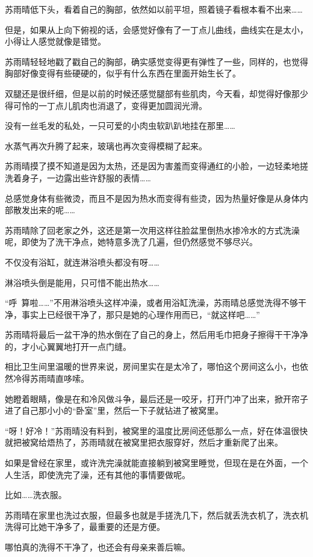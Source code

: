 苏雨晴低下头，看着自己的胸部，依然如以前平坦，照着镜子看根本看不出来……

但是，如果从上向下俯视的话，会感觉好像有了一丁点儿曲线，曲线实在是太小，小得让人感觉就像是错觉。

苏雨晴轻轻地戳了戳自己的胸部，确实感觉变得更有弹性了一些，同样的，也觉得胸部好像变得有些硬硬的，似乎有什么东西在里面开始生长了。

双腿还是很纤细，但是以前的时候还感觉腿部有些肌肉，今天看，却觉得好像那少得可怜的一丁点儿肌肉也消退了，变得更加圆润光滑。

没有一丝毛发的私处，一只可爱的小肉虫软趴趴地挂在那里……

水蒸气再次升腾了起来，玻璃也再次变得模糊了起来。

苏雨晴摸了摸不知道是因为太热，还是因为害羞而变得通红的小脸，一边轻柔地搓洗着身子，一边露出些许舒服的表情……

总感觉身体有些微烫，而且不是因为热水而变得有些烫，因为热量好像是从身体内部散发出来的呢……

苏雨晴除了回老家之外，这还是第一次用这样往脸盆里倒热水掺冷水的方式洗澡呢，即使为了洗干净点，她特意多洗了几遍，但仍然感觉不够尽兴。

不仅没有浴缸，就连淋浴喷头都没有呀……

淋浴喷头倒是能用，只可惜不能出热水……

“呼~算啦……”不用淋浴喷头这样冲澡，或者用浴缸洗澡，苏雨晴总感觉洗得不够干净，事实上已经很干净了，那只是她的心理作用而已，“就这样吧……”

苏雨晴将最后一盆干净的热水倒在了自己的身上，然后用毛巾把身子擦得干干净净的，才小心翼翼地打开一点门缝。

相比卫生间里温暖的世界来说，房间里实在是太冷了，哪怕这个房间这么小，也依然冷得苏雨晴直哆嗦。

她瞪着眼睛，像是在和冷风做斗争，最后还是一咬牙，打开门冲了出来，掀开帘子进了自己那小小的“卧室”里，然后一下子就钻进了被窝里。

“呀！好冷！”苏雨晴没有料到，被窝里的温度比房间还低那么一点，好在体温很快就把被窝给焐热了，苏雨晴就在被窝里把衣服穿好，然后才重新爬了出来。

如果是曾经在家里，或许洗完澡就能直接躺到被窝里睡觉，但现在是在外面，一个人生活，即使洗完了澡，还有其他的事情要做呢。

比如……洗衣服。

苏雨晴在家里也洗过衣服，但最多也就是手搓洗几下，然后就丢洗衣机了，洗衣机洗得可比她干净多了，最重要的还是方便。

哪怕真的洗得不干净了，也还会有母亲来善后嘛。

